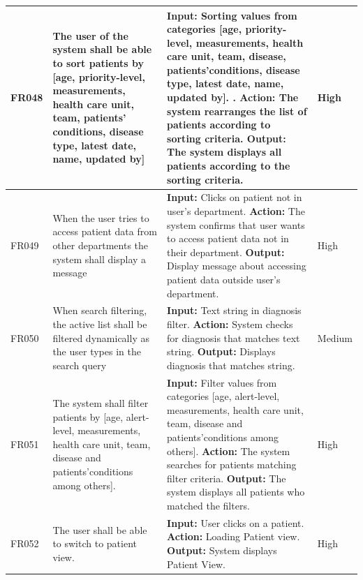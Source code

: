 \documentclass{scrreprt}
\begin{document}
\begin{center}
\begin{tabularx}{\linewidth}{| l | X | X | l |}
\hline
\end{tabularx}
\begin{tabularx}{\linewidth}{| l | X | X | l |}
\hline
FR048 & The user of the system shall be able to sort patients by [age, priority-level, measurements, health care unit, team, patients’ conditions, disease type, latest date, name, updated by] & \textbf{Input:} Sorting values from categories [age, priority-level, measurements, health care unit, team, disease, patients’conditions, disease type, latest date, name, updated by]. .
\newline \textbf{Action:} The system rearranges the list of patients according to sorting criteria.
\newline \textbf{Output:} The system displays all patients according to the sorting criteria. & High \\ 
\hline
FR049 & When the user tries to access patient data from other departments the system shall display a message & \textbf{Input:} Clicks on patient not in user's department.
\newline \textbf{Action:} The system confirms that user wants to access patient data not in their department.
\newline \textbf{Output:} Display message about accessing patient data outside user's department. & High \\ 
\hline
FR050 & When search filtering, the active list shall be filtered dynamically as the user types in the search query     & \textbf{Input:} Text string in diagnosis filter.
\newline \textbf{Action:} System checks for diagnosis that matches text string.
\newline \textbf{Output:} Displays diagnosis that matches string. & Medium \\ 
\hline
FR051 & The system shall filter patients by [age, alert-level, measurements, health care unit, team, disease and patients’conditions among others].  & \textbf{Input:} Filter values from categories [age, alert-level, measurements, health care unit, team, disease and patients’conditions among others].
\newline \textbf{Action:} The system searches for patients matching filter criteria.
\newline \textbf{Output:} The system displays all patients who matched the filters. & High \\ 
\hline
FR052 & The user shall be able to switch to patient view. & \textbf{Input:} User clicks on a patient.
\newline \textbf{Action:} Loading Patient view.
\newline \textbf{Output:} System displays Patient View. & High \\ 
\hline
\end{tabularx}
\end{center}
\end{document}
